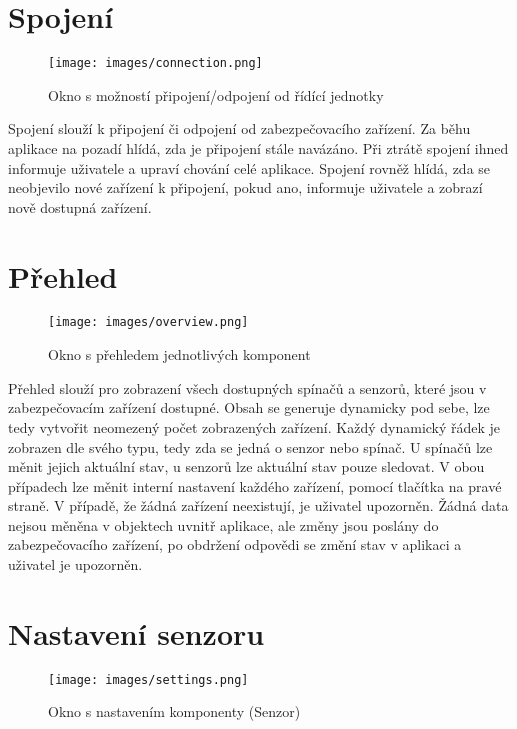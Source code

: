 \documentclass[FM,MP]{tulthesis}  %
\begin{document}
\section{Spojení}

\begin{figure}[H]
\begin{center}
\texttt{[image: images/connection.png]}
\caption{Okno s možností připojení/odpojení od řídící jednotky}
\label{image}
\end{center}
\end{figure}

Spojení slouží k připojení či odpojení od zabezpečovacího zařízení. Za běhu aplikace na pozadí hlídá, zda je připojení stále navázáno. Při ztrátě spojení ihned informuje uživatele a upraví chování celé aplikace. Spojení rovněž hlídá, zda se neobjevilo nové zařízení k připojení, pokud ano, informuje uživatele a zobrazí nově dostupná zařízení.

\section{Přehled}

\begin{figure}[H]
\begin{center}
\texttt{[image: images/overview.png]}
\caption{Okno s přehledem jednotlivých komponent}
\label{image}
\end{center}
\end{figure}

Přehled slouží pro zobrazení všech dostupných spínačů a senzorů, které jsou v zabezpečovacím zařízení dostupné. Obsah se generuje dynamicky pod sebe, lze tedy vytvořit neomezený počet zobrazených zařízení. Každý dynamický řádek je zobrazen dle svého typu, tedy zda se jedná o senzor nebo spínač. U spínačů lze měnit jejich aktuální stav, u senzorů lze aktuální stav pouze sledovat. V obou případech lze měnit interní nastavení každého zařízení, pomocí tlačítka na pravé straně. V případě, že žádná zařízení neexistují, je uživatel upozorněn. Žádná data nejsou měněna v objektech uvnitř aplikace, ale změny jsou poslány do zabezpečovacího zařízení, po obdržení odpovědi se změní stav v aplikaci a uživatel je upozorněn.

\section{Nastavení senzoru}

\begin{figure}[H]
\begin{center}
\texttt{[image: images/settings.png]}
\caption{Okno s nastavením komponenty (Senzor)}
\label{image}
\end{center}
\end{figure}
\end{document}
